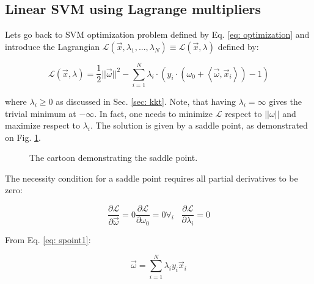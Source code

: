 \subsection{Linear SVM using Lagrange multipliers}
\label{sec: svmLinearLM}

Lets go back to SVM optimization problem defined by Eq. \ref{eq: optimization} and introduce the Lagrangian $\mathcal{L} (\vec x, \lambda_1, ..., \lambda_N) \equiv \mathcal{L} (\vec x, \lambda)$ defined by:

\begin{equation} 
  \mathcal{L} (\vec x, \lambda) = \frac{1}{2}||\vec\omega||^2 - \sum_{i=1}^N \lambda_i \cdot \left(y_i \cdot \left(\omega_0 + \left<\vec\omega, \vec x_i\right>\right) - 1\right)
  \label{eq: svmL}
\end{equation}

where $\lambda_i \geq 0$ as discussed in Sec. \ref{sec: kkt}. Note, that having $\lambda_i = \infty$ gives the trivial minimum at $-\infty$. In fact, one needs to minimize $\mathcal{L}$ respect to $||\omega||$ and maximize respect to $\lambda_i$. The solution is given by a saddle point, as demonstrated on Fig. \ref{fig: spoint}.

\begin{figure}
 \centering
 \caption{The cartoon demonstrating the saddle point.}
 \label{fig: spoint}
\end{figure}

The necessity condition for a saddle point requires all partial derivatives to be zero:

\begin{subequations}
 \begin{equation}
  \frac{\partial\mathcal{L}}{\partial\vec\omega} = 0
  \label{eq: spoint1}
 \end{equation}
 \begin{equation}
  \frac{\partial\mathcal{L}}{\partial\omega_0} = 0
  \label{eq: spoint2}
 \end{equation}
 \begin{equation}
  \forall_i \hspace{10pt} \frac{\partial\mathcal{L}}{\partial\lambda_i} = 0
  \label{eq: spoint3}
 \end{equation}
 \label{eq: spoint}
\end{subequations}

From Eq. \ref{eq: spoint1}:

\begin{equation}
 \vec\omega = \sum_{i=1}^N \lambda_iy_i\vec x_i
 \label{eq: from1}
\end{equation}

